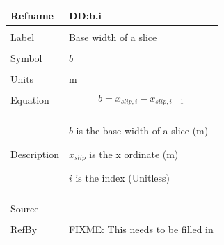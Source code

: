 \documentclass[12pt]{article}
\begin{document}
\noindent \begin{minipage}{\textwidth}
\begin{tabular}{p{} p{}}
\toprule \textbf{Refname} & \textbf{DD:b.i}
\label{DD:b.i}
\\ \midrule \\
Label & Base width of a slice
\\ \midrule \\
Symbol & $b$
\\ \midrule \\
Units & m
\\ \midrule \\
Equation & \begin{dmath}
           b={x_{slip,i}}-{x_{slip,i-1}}
           \end{dmath}
\\ \midrule \\
Description & \begin{symbDescription}
              \item{$b$ is the base width of a slice (m)}
              \item{${x_{slip}}$ is the x ordinate (m)}
              \item{$i$ is the index (Unitless)}
              \end{symbDescription}
\\ \midrule \\
Source & 
\\ \midrule \\
RefBy & FIXME: This needs to be filled in
\\ \bottomrule \end{tabular}
\end{minipage}\\
~\newline
\end{document}
